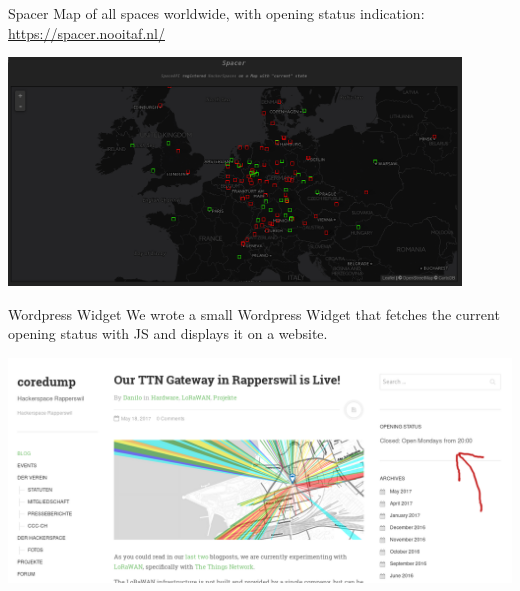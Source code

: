 \begin{frame}{Spacer}
	Map of all spaces worldwide, with opening status indication:
	\url{https://spacer.nooitaf.nl/}

	\vspace{1em}
	\centerline{
		\includegraphics[width=0.9\textwidth]{what_is_the_spaceapi/app-spacer.png}
	}

\end{frame}

\begin{frame}{Wordpress Widget}
	We wrote a small Wordpress Widget that fetches the current opening status with
	JS and displays it on a website.

	\vspace{1em}
	\centerline{
		\includegraphics[width=\textwidth]{what_is_the_spaceapi/app-wp.png}
	}

\end{frame}

